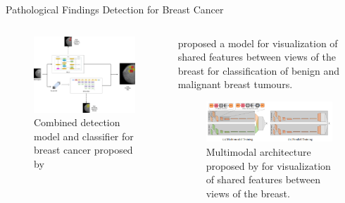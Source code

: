 \begin{frame}{Pathological Findings Detection for Breast Cancer}
\begin{columns}
\begin{column}{0.3\textwidth}
            \begin{figure}
                \centering
                \includegraphics[height=0.3\textheight]{imagenes/frankyolo.jpg}
                \caption{Combined detection model and classifier for breast cancer proposed by \citeauthor{frankDeepLearningArchitecture2023}}
            \end{figure}
        \end{column}
        \pause
        \begin{column}{0.3\textwidth}
            \citeauthor{yiOptimizingVisualizingDeep2017} proposed a model for visualization of shared features between views of the breast for classification of benign and malignant breast tumours.
            \begin{figure}
                \centering
                \includegraphics[width=\textwidth]{imagenes/yiparallel.png}
                \caption{Multimodal architecture proposed by \citeauthor{yiOptimizingVisualizingDeep2017} for visualization of shared features between views of the breast.}
            \end{figure}
        \end{column}
    \end{columns}
\end{frame}

